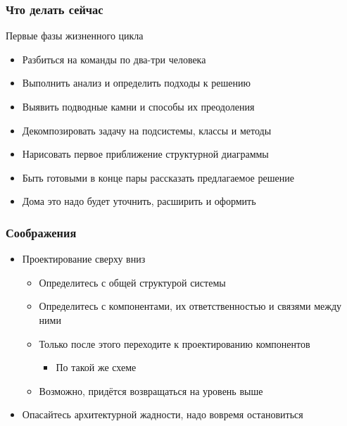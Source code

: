 \documentclass{../../slides-style}
\begin{document}
    \begin{frame}
        \frametitle{Что делать сейчас}
        Первые фазы жизненного цикла
        \begin{itemize}
            \item Разбиться на команды по два-три человека
            \item Выполнить анализ и определить подходы к решению
            \item Выявить подводные камни и способы их преодоления
            \item Декомпозировать задачу на подсистемы, классы и методы
            \item Нарисовать первое приближение структурной диаграммы
            \item Быть готовыми в конце пары рассказать предлагаемое решение
            \item Дома это надо будет уточнить, расширить и оформить
        \end{itemize}
    \end{frame}

    \begin{frame}
        \frametitle{Соображения}
        \begin{itemize}
            \item Проектирование сверху вниз
            \begin{itemize}
                \item Определитесь с общей структурой системы
                \item Определитесь с компонентами, их ответственностью и связями между ними
                \item Только после этого переходите к проектированию компонентов
                \begin{itemize}
                    \item По такой же схеме
                \end{itemize}
                \item Возможно, придётся возвращаться на уровень выше
            \end{itemize}
            \item Опасайтесь архитектурной жадности, надо вовремя остановиться
        \end{itemize}
    \end{frame}
\end{document}
